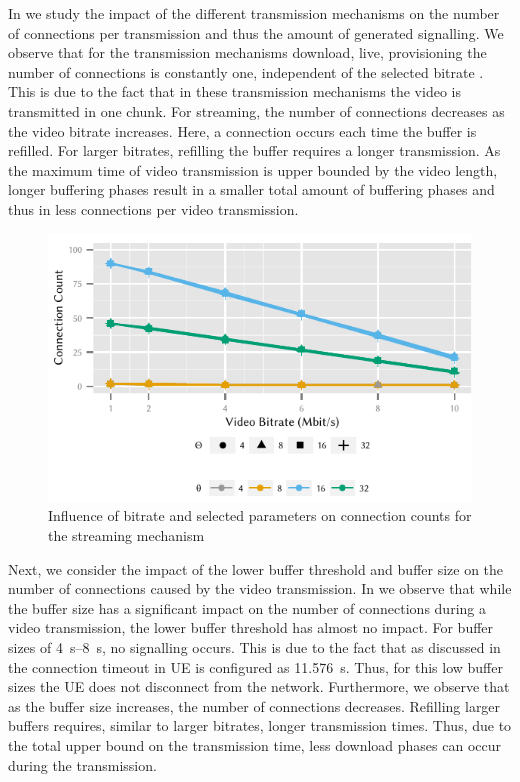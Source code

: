 In  we study the impact of the different transmission mechanisms on the number of connections per transmission and thus the amount of generated signalling.
We observe that for the transmission mechanisms download, live, provisioning the number of connections is constantly one, independent of the selected bitrate \bitrate.
This is due to the fact that in these transmission mechanisms the video is transmitted in one chunk.
For streaming, the number of connections decreases as the video bitrate increases.
Here, a connection occurs each time the buffer is refilled.
For larger bitrates, refilling the buffer requires a longer transmission.
As the maximum time of video transmission is upper bounded by the video length, longer buffering phases result in a smaller total amount of buffering phases and thus in less connections per video transmission.

\begin{figure}
  \centering
  \includegraphics{application/lte_video/numerical_evaluation/figures/bitrate2connections_parameters}
  \caption{Influence of bitrate and selected parameters on connection counts for the streaming mechanism}
  \label{fig:application:lte_video:numerical_evaluation:energy_consumption:bitrate2connections_parameters}
\end{figure}

Next, we consider the impact of the lower buffer threshold \bufferlower and buffer size \buffersize on the number of connections \connectioncount caused by the video transmission.
In  we observe that while the buffer size has a significant impact on the number of connections during a video transmission, the lower buffer threshold has almost no impact.
For buffer sizes of \SIrange{4}{8}{\second}, no signalling occurs.
This is due to the fact that as discussed in  the connection timeout in \gls{UE} is configured as \SI{11.576}{\second}.
Thus, for this low buffer sizes the \gls{UE} does not disconnect from the network.
Furthermore, we observe that as the buffer size increases, the number of connections decreases.
Refilling larger buffers requires, similar to larger bitrates, longer transmission times.
Thus, due to the total upper bound on the transmission time, less download phases can occur during the transmission.